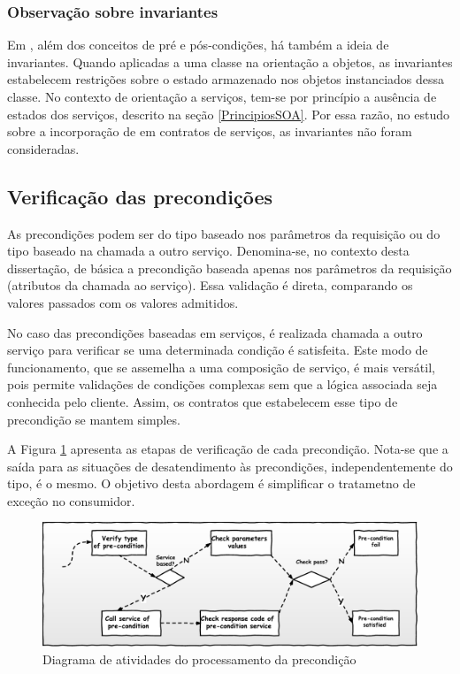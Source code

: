 \subsubsection{Observação sobre invariantes}
\vspace{-6mm}

Em \designbycontract{}, além dos conceitos de pré e pós-condições,
há também a ideia de invariantes\cite{meyer1997object}. Quando aplicadas a uma classe na
orientação a objetos, as invariantes estabelecem restrições sobre o estado
armazenado nos objetos instanciados dessa classe. No contexto de orientação a
serviços, tem-se por princípio a ausência de estados dos serviços, descrito na
seção \ref{PrincipiosSOA}. Por essa razão, no estudo sobre a incorporação de
\designbycontract{} em contratos de serviços, as invariantes não foram
consideradas.


\subsection{Verificação das precondições}
\vspace{-6mm}

As precondições podem ser do tipo baseado nos parâmetros da requisição ou do
tipo baseado na chamada a outro serviço. Denomina-se, no contexto desta
dissertação, de básica a precondição baseada apenas nos parâmetros da
requisição (atributos da chamada ao serviço). Essa validação é direta,
comparando os valores passados com os valores admitidos. 

No caso das precondições baseadas em serviços, é realizada chamada a outro
serviço para verificar se uma determinada condição é satisfeita. Este modo de
funcionamento, que se assemelha a uma composição de serviço, é mais versátil, pois permite
validações de condições complexas sem que a lógica associada seja conhecida pelo
cliente. Assim, os contratos que estabelecem esse tipo de
precondição se mantem simples.

A Figura \ref{FigServicePrecondition} apresenta as etapas de verificação de cada
precondição. Nota-se que a saída para as situações de desatendimento às
precondições, independentemente do tipo, é o mesmo. O objetivo desta abordagem
é simplificar o tratametno de exceção no consumidor.

\begin{figure}[!htb]
\centering
\includegraphics[width=140mm,trim = 0mm 0mm 0mm
0mm,clip]{img/FluxoPrecondicoes.pdf}
\caption{Diagrama de atividades do processamento da precondição}
\label{FigServicePrecondition}
\end{figure}


